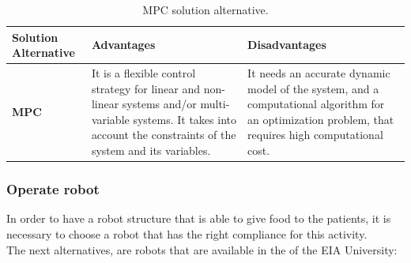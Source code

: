 \documentclass[11pt]{report} %
\begin{document}
\begin{table}[H]
\begin{center}
    \begin{tabular}{M{6.6cm}M{3.3cm}M{3.3cm}}
    \hline
    \textbf{Solution Alternative} & \textbf{Advantages} & \textbf{Disadvantages} \\ 
    \hline
    
    \textbf{MPC}

    
    \citep{cite_model_predictive_control_camacho_bordons}

    &
    
    It is a flexible control strategy for linear and non-linear systems and/or multi-variable systems. It takes into account the constraints of the system and its variables.

    &
    
    It needs an accurate dynamic model of the system, and a computational algorithm for an optimization problem, that requires high computational cost.
    
    \\ \hline
    \end{tabular}
\caption{\label{tab:mpc} MPC solution alternative.}

\end{center}
\end{table}

\subsubsection{Operate robot}

In order to have a robot structure that is able to give food to the patients, it is necessary to choose a robot that has the right compliance for this activity.\\

The next alternatives, are robots that are available in the  of the EIA University:\\
\end{document}
